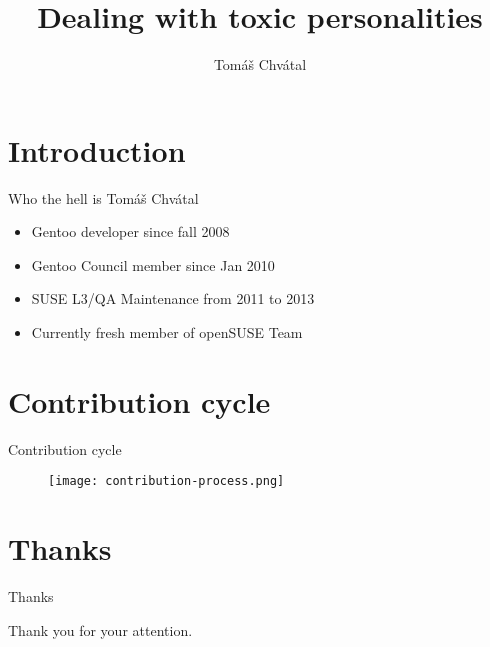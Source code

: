 \documentclass{beamer}
\author{Tom\'{a}\v{s} Chv\'{a}tal\newline {\small openSUSE Team}}
\title{Dealing with toxic personalities}
\begin{document}
\begin{frame}[t,plain]
\titlepage
\end{frame}

\section{Introduction}

\begin{frame}{Who the hell is Tomáš Chvátal}
	\begin{itemize}
	\item Gentoo developer since fall 2008
	\item Gentoo Council member since Jan 2010
	\item SUSE L3/QA Maintenance from 2011 to 2013
	\item Currently fresh member of openSUSE Team
	\end{itemize}
\end{frame}

\section{Contribution cycle}

\begin{frame}{Contribution cycle}
	\begin{figure}
	\texttt{[image: contribution-process.png]}
	\end{figure}
\end{frame}

\section{Thanks}

\begin{frame}{Thanks}
	\begin{center}
	Thank you for your attention.
	\end{center}
\end{frame}
\end{document}
